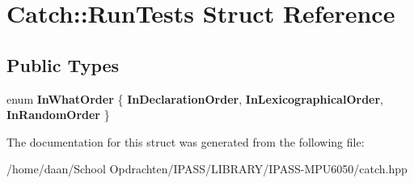 \hypertarget{structCatch_1_1RunTests}{}\section{Catch\+:\+:Run\+Tests Struct Reference}
\label{structCatch_1_1RunTests}
\subsection*{Public Types}
\begin{DoxyCompactItemize}
\item 
\mbox{\label{structCatch_1_1RunTests_ab56bd851b1dd085869992d1a9d73dc5d}} 
enum {\bfseries In\+What\+Order} \{ {\bfseries In\+Declaration\+Order}, 
{\bfseries In\+Lexicographical\+Order}, 
{\bfseries In\+Random\+Order}
 \}
\end{DoxyCompactItemize}


The documentation for this struct was generated from the following file\+:\begin{DoxyCompactItemize}
\item 
/home/daan/\+School Opdrachten/\+I\+P\+A\+S\+S/\+L\+I\+B\+R\+A\+R\+Y/\+I\+P\+A\+S\+S-\/\+M\+P\+U6050/catch.\+hpp\end{DoxyCompactItemize}
